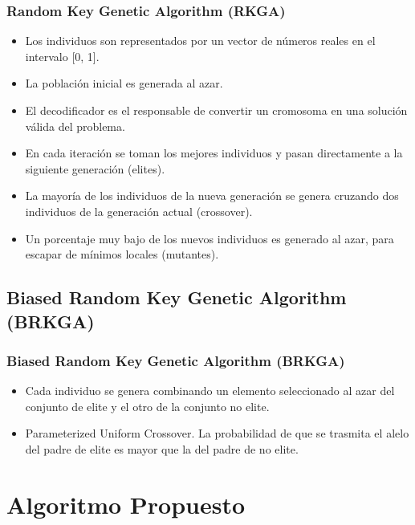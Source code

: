 \documentclass{beamer}
\begin{document}
\begin{frame}
\frametitle{Random Key Genetic Algorithm (RKGA)}

\begin{itemize}
    \item Los individuos son representados por un vector de números reales en el intervalo [0, 1].
    \pause
    \item La población inicial es generada al azar.
    \pause
    \item El decodificador es el responsable de convertir un cromosoma en una solución válida del problema.
    \pause
    \item En cada iteración se toman los mejores individuos y pasan directamente a la siguiente generación (elites).
    \pause
    \item La mayoría de los individuos de la nueva generación se genera cruzando dos individuos de la generación actual (crossover).
    \pause
    \item Un porcentaje muy bajo de los nuevos individuos es generado al azar, para escapar de mínimos locales (mutantes).
\end{itemize}

\end{frame}


\subsection{Biased Random Key Genetic Algorithm (BRKGA)}

\begin{frame}
\frametitle{Biased Random Key Genetic Algorithm (BRKGA)}

\begin{itemize}
    \item Cada individuo se genera combinando un elemento seleccionado al azar del conjunto de elite y el otro de la conjunto no elite.
    \pause
    \item Parameterized Uniform Crossover. La probabilidad de que se trasmita el alelo del padre de elite es mayor que la del padre de no elite.
\end{itemize}

\end{frame}


\section{Algoritmo Propuesto}
\end{document}
